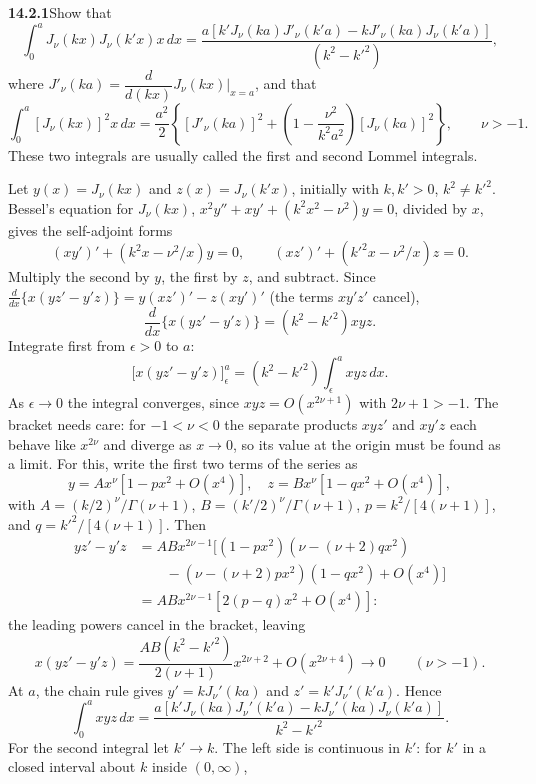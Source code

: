 \par\bigskip
\noindent\textbf{14.2.1}\quad Show that
\[
\int_{0}^{a}J_{\nu}(kx)J_{\nu}(k'x)x\,dx
=\frac{a[k'J_{\nu}(ka)J'_{\nu}(k'a)-kJ'_{\nu}(ka)J_{\nu}(k'a)]}
{(k^{2}-k'^{2})},
\]
where $J'_{\nu}(ka)=\dfrac{d}{d(kx)}J_{\nu}(kx)\Big|_{x=a}$, and that
\[
\int_{0}^{a}[J_{\nu}(kx)]^{2}x\,dx
=\frac{a^{2}}{2}\left\{[J'_{\nu}(ka)]^{2}
+\left(1-\frac{\nu^{2}}{k^{2}a^{2}}\right)[J_{\nu}(ka)]^{2}\right\},
\qquad\nu>-1.
\]
These two integrals are usually called the first and second Lommel
integrals.
\par{}
\solution
Let $y(x)=J_\nu(kx)$ and $z(x)=J_\nu(k'x)$, initially with
$k,k'>0$, $k^2\ne k'^2$. Bessel's equation for $J_\nu(kx)$,
$x^2y''+xy'+(k^2x^2-\nu^2)y=0$, divided by $x$, gives the
self-adjoint forms
\[
(xy')'+(k^2x-\nu^2/x)y=0,\qquad
(xz')'+(k'^2x-\nu^2/x)z=0.
\]
Multiply the second by $y$, the first by $z$, and subtract. Since
$\frac d{dx}\{x(yz'-y'z)\}=y(xz')'-z(xy')'$ (the terms $xy'z'$
cancel),
\[
\frac d{dx}\{x(yz'-y'z)\}=(k^2-k'^2)xyz.
\]
Integrate first from $\epsilon>0$ to $a$:
\[
\bigl[x(yz'-y'z)\bigr]_\epsilon^a=(k^2-k'^2)\int_\epsilon^a xyz\,dx.
\]
As $\epsilon\to0$ the integral converges, since $xyz=O(x^{2\nu+1})$
with $2\nu+1>-1$. The bracket needs care: for $-1<\nu<0$ the separate
products $xyz'$ and $xy'z$ each behave like $x^{2\nu}$ and diverge as
$x\to0$, so its value at the origin must be found as a limit. For
this, write the first two terms of the series as
\[
y=A x^\nu\left[1-px^2+O(x^4)\right],\quad
z=B x^\nu\left[1-qx^2+O(x^4)\right],
\]
with $A=(k/2)^\nu/\Gamma(\nu+1)$, $B=(k'/2)^\nu/\Gamma(\nu+1)$,
$p=k^2/[4(\nu+1)]$, and $q=k'^2/[4(\nu+1)]$. Then
\begin{align*}
yz'-y'z&=ABx^{2\nu-1}\bigl[(1-px^2)(\nu-(\nu+2)qx^2)\\
&\qquad-(\nu-(\nu+2)px^2)(1-qx^2)+O(x^4)\bigr]\\
&=ABx^{2\nu-1}[2(p-q)x^2+O(x^4)]:
\end{align*}
the leading powers cancel in the bracket, leaving
\[
x(yz'-y'z)=\frac{AB(k^2-k'^2)}{2(\nu+1)}x^{2\nu+2}
+O(x^{2\nu+4})\longrightarrow0\qquad(\nu>-1).
\]
At $a$, the chain rule gives $y'=kJ_\nu'(ka)$ and
$z'=k'J_\nu'(k'a)$. Hence
\[
\boxed{\int_0^a xyz\,dx=
\frac{a[k'J_\nu(ka)J_\nu'(k'a)-kJ_\nu'(ka)J_\nu(k'a)]}
{k^2-k'^2}}.
\]
For the second integral let $k'\to k$. The left side is continuous
in $k'$: for $k'$ in a closed interval about $k$ inside $(0,\infty)$,
